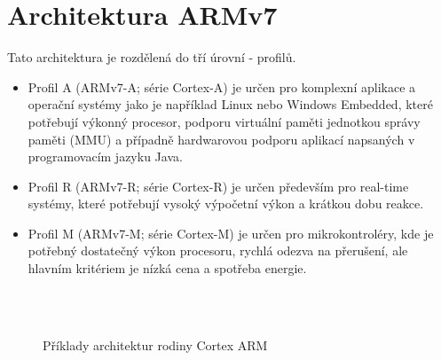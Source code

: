 \section{Architektura ARMv7}
  Tato architektura je rozdělená do tří úrovní - profilů.
  \begin{itemize}[noitemsep]
    \item Profil A (ARMv7-A; série Cortex-A) je určen pro komplexní aplikace a operační systémy  
          jako je například Linux nebo Windows Embedded, které potřebují výkonný procesor, podporu 
          virtuální paměti jednotkou správy paměti (MMU) a případně hardwarovou podporu aplikací 
          napsaných v programovacím jazyku Java.
    \item Profil R (ARMv7-R; série Cortex-R) je určen především pro real-time systémy, které 
          potřebují vysoký výpočetní výkon a krátkou dobu reakce.
    \item Profil M (ARMv7-M; série Cortex-M) je určen pro mikrokontroléry, kde je potřebný  
          dostatečný výkon procesoru, rychlá odezva na přerušení, ale hlavním kritériem je nízká 
          cena a spotřeba energie.
  \end{itemize}
  
  \begin{figure}[ht!]
    \centering
      {}              \\
      {}              \\
      {}
    \caption{Příklady architektur rodiny Cortex ARM}
  \end{figure}

